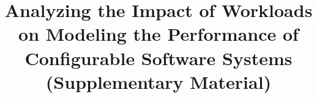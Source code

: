 \documentclass[10pt,conference]{IEEEtran}
\begin{document}
	
	\title{
		Analyzing the Impact of Workloads on Modeling the Performance of Configurable Software Systems (Supplementary Material)
	}
	
	
	
	\maketitle

	
	
	
	
	
\end{document}

